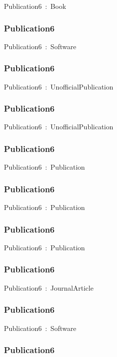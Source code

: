 \documentclass{article}
\begin{document}
Publication6~:~Book

\subsubsection*{Publication6}

Publication6~:~Software

\subsubsection*{Publication6}

Publication6~:~UnofficialPublication

\subsubsection*{Publication6}

Publication6~:~UnofficialPublication

\subsubsection*{Publication6}

Publication6~:~Publication

\subsubsection*{Publication6}

Publication6~:~Publication

\subsubsection*{Publication6}

Publication6~:~Publication

\subsubsection*{Publication6}

Publication6~:~JournalArticle

\subsubsection*{Publication6}

Publication6~:~Software

\subsubsection*{Publication6}
\end{document}
